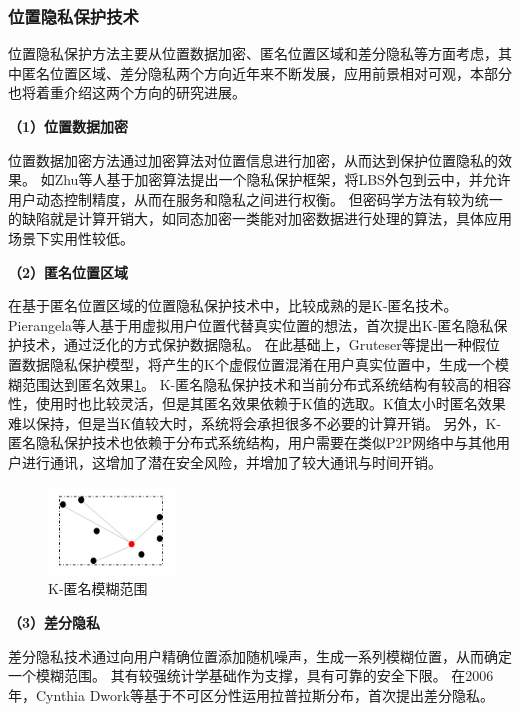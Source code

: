 \documentclass[zihao=-4]{ctexart}
\begin{document}
\subsubsection{位置隐私保护技术}
位置隐私保护方法主要从位置数据加密、匿名位置区域和差分隐私等方面考虑，其中匿名位置区域、差分隐私两个方向近年来不断发展，应用前景相对可观，本部分也将着重介绍这两个方向的研究进展。
\par 
\textbf{（1）位置数据加密}
\par 
位置数据加密方法通过加密算法对位置信息进行加密，从而达到保护位置隐私的效果。
如Zhu等人基于加密算法提出一个隐私保护框架，将LBS外包到云中，并允许用户动态控制精度，从而在服务和隐私之间进行权衡。\cite{czh_6.3}
但密码学方法有较为统一的缺陷就是计算开销大，如同态加密一类能对加密数据进行处理的算法，具体应用场景下实用性较低。
\par 
\textbf{（2）匿名位置区域}
\par 
在基于匿名位置区域的位置隐私保护技术中，比较成熟的是K-匿名技术。
Pierangela等人基于用虚拟用户位置代替真实位置的想法，首次提出K-匿名隐私保护技术，通过泛化的方式保护数据隐私。\cite{czh_6.4}
在此基础上，Gruteser等\cite{czh_6.5}提出一种假位置数据隐私保护模型，将产生的K个虚假位置混淆在用户真实位置中，生成一个模糊范围达到匿名效果\ref{k匿名}。
K-匿名隐私保护技术和当前分布式系统结构有较高的相容性，使用时也比较灵活，但是其匿名效果依赖于K值的选取。K值太小时匿名效果难以保持，但是当K值较大时，系统将会承担很多不必要的计算开销。
另外，K-匿名隐私保护技术也依赖于分布式系统结构，用户需要在类似P2P网络中与其他用户进行通讯，这增加了潜在安全风险，并增加了较大通讯与时间开销。
\begin{figure}[H] %
    \centering %
    \includegraphics[width=0.3\textwidth]{K匿名.jpg} %
    \caption{K-匿名模糊范围} %
    \label{k匿名} %
\end{figure}
\par 
\textbf{（3）差分隐私}
\par 
差分隐私技术通过向用户精确位置添加随机噪声，生成一系列模糊位置，从而确定一个模糊范围。
其有较强统计学基础作为支撑，具有可靠的安全下限。
在2006年，Cynthia Dwork等\cite{czh_6.6}基于不可区分性运用拉普拉斯分布，首次提出差分隐私。
\end{document}

